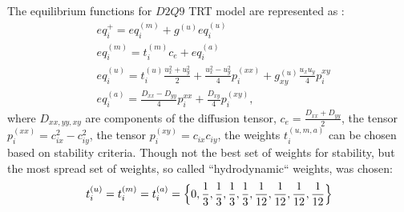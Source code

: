 \documentclass{article}
\begin{document}
The equilibrium functions for $D2Q9$ TRT model are represented as \cite{kuzmin-stability-optimal}:
\begin{equation}
\begin{aligned}
&eq_i^{+}=eq_i^{(m)}+g^{(u)} eq_i^{(u)}\\
&eq_i^{(m)}=t_i^{(m)} c_e+ eq_i^{(a)}\\
&eq_i^{(u)}=t_i^{(u)} \frac{u_x^2+u_y^2}{2}+\frac{u_x^2-u_y^2}{4} p_i^{(xx)}+g_{xy}^{(u)}\frac{u_x
u_y}{4} p_i^{xy}\\
&eq_i^{(a)}=\frac{D_{xx}-D_{yy}}{4} p_i^{xx}+\frac{D_{xy}}{4} p_i^{(xy)},
\end{aligned}
\end{equation}
where $D_{xx,yy,xy}$ are components of the diffusion tensor, $c_e=\frac{D_{xx}+D_{yy}}{2}$, the tensor $p_i^{(xx)}=c_{ix}^2-c_{iy}^2$, the tensor  $p_i^{(xy)}=c_{ix} c_{iy}$, the weights
$t_i^{(u,m,a)}$ can be chosen based on stability criteria. Though not the best set of weights for
stability, but the most spread set of weights, so called ``hydrodynamic`` weights, was chosen:
\begin{equation}
t_i^{(u)}=t_i^{(m)}=t_i^{(a)}=\Bigl\{0,\frac{1}{3},\frac{1}{3},\frac{1}{3},\frac{1}{3},\frac{1}{12},
\frac {1}{12},\frac{1}{12},\frac{1}{12}\Bigr\}
\end{equation}
 
\end{document}
